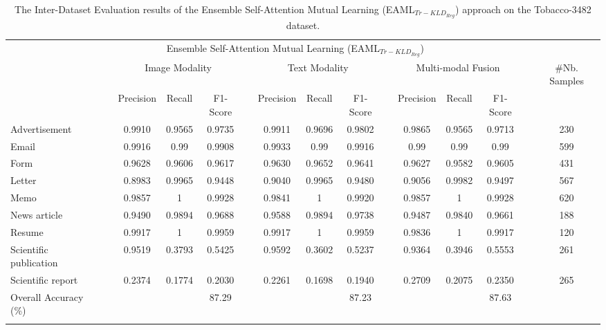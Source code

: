 \documentclass[twocolumn]{svjour3}
\begin{document}
\setlength\tabcolsep{3.8 pt}
\begin{table*}[tbh]
\small
\centering
\caption{The Inter-Dataset Evaluation results of the Ensemble Self-Attention Mutual Learning (EAML$_{{Tr-KLD}_{Reg}}$) approach on the Tobacco-3482 dataset.}
\resizebox{\textwidth}{!} {\begin{tabular}{lcccccccccccccc}
    \hline\noalign{\smallskip}
     \multicolumn{1}{c}{} && \multicolumn{10}{c}{Ensemble Self-Attention Mutual Learning (EAML$_{{Tr-KLD}_{Reg}}$)} \\
         \noalign{\smallskip}\hline\noalign{\smallskip}
         \multicolumn{1}{c}{Class Labels} && \multicolumn{3}{c}{Image Modality} && \multicolumn{3}{c}{Text Modality} && \multicolumn{3}{c}{Multi-modal Fusion} && \multicolumn{1}{c}{\#Nb. Samples} \\
         \noalign{\smallskip}\hline\noalign{\smallskip}
          && Precision & Recall & F1-Score &&  Precision & Recall & F1-Score && Precision & Recall & F1-Score\\
         \cmidrule{3-14}
         Advertisement 
         && 0.9910 & 0.9565 & 0.9735
         && 0.9911 & 0.9696 & 0.9802 
         && 0.9865 & 0.9565 & 0.9713 
         && 230 \\
         Email 
         && 0.9916 & 0.99 & 0.9908 
         && 0.9933 & 0.99 & 0.9916 
         && 0.99 & 0.99 & 0.99 
         && 599 \\
         Form 
         && 0.9628 & 0.9606 & 0.9617 
         && 0.9630 & 0.9652 & 0.9641 
         && 0.9627 & 0.9582 & 0.9605 
         && 431 \\
         Letter 
         && 0.8983 & 0.9965 & 0.9448
         && 0.9040 & 0.9965 & 0.9480 
         && 0.9056 & 0.9982 & 0.9497 
         && 567 \\
         Memo 
         && 0.9857 & 1 & 0.9928 
         && 0.9841 & 1 & 0.9920 
         && 0.9857 & 1 & 0.9928 
         && 620 \\
         News article 
         && 0.9490 & 0.9894 & 0.9688
         && 0.9588 & 0.9894 & 0.9738 
         && 0.9487 & 0.9840 & 0.9661 
         && 188 \\
         Resume 
         && 0.9917 & 1 & 0.9959 
         && 0.9917 & 1 & 0.9959 
         && 0.9836 & 1 & 0.9917 
         && 120 \\
         Scientific publication 
         && 0.9519 & 0.3793 & 0.5425
         && 0.9592 & 0.3602 & 0.5237 
         && 0.9364 & 0.3946 & 0.5553 
         && 261 \\
         Scientific report 
         && 0.2374 & 0.1774 & 0.2030
         && 0.2261 & 0.1698 & 0.1940 
         && 0.2709 & 0.2075 & 0.2350 
         && 265 \\
    \noalign{\smallskip}\hline\noalign{\smallskip}
        Overall Accuracy (\%) && & & 87.29 &&  &  & 87.23 &&  &  & 87.63 \\
    \noalign{\smallskip}\hline
    \end{tabular}}
    \label{tab:Evaluation of APML on tobacco}
\end{table*}
\end{document}
